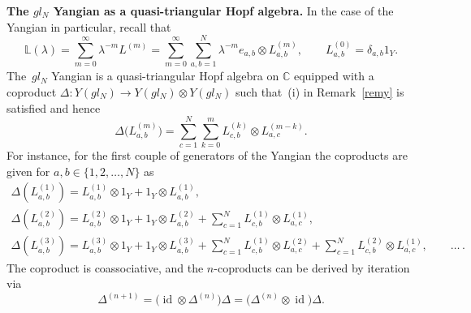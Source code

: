 \documentclass[10pt,a4paper]{amsart}
\numberwithin{equation}{section}
\theoremstyle{definition}
\newcommand{\id}{\operatorname{id}}
\def\boldsymbol#1{#1}%
\def\mathfrak#1{#1}%
\def\mathcal#1{#1}%
\begin{document}
{\bf The $\boldsymbol{\mathfrak{gl}_{\mathcal N}}$ Yangian as a quasi-triangular Hopf algebra.} In the case of the Yangian in particular, recall that
\[
{\mathbb L}(\lambda) = \sum_{m=0}^{\infty} \lambda^{-m } L^{(m)}= \sum_{m=0}^{\infty }\sum_{a,b =1}^{\mathcal N} \lambda^{-m}e_{a,b} \otimes L_{a,b}^{(m)}, \qquad L^{(0)}_{a,b} = \delta_{a,b}1_{\mathcal Y}.
\]
The~$\mathfrak{gl}_{\mathcal N}$ Yangian is a quasi-triangular Hopf algebra on ${\mathbb C}$ equipped with a coproduct $\Delta\colon\! {\mathcal Y}(\mathfrak{gl}_{\mathcal N})\! \to{\mathcal Y}(\mathfrak{gl}_{\mathcal N}) \otimes {\mathcal Y}(\mathfrak{gl}_{\mathcal N})$ such that~(i) in Remark~\ref{remy} is satisfied and hence
\begin{equation*}
\Delta\bigl(L^{(m)}_{a,b}\bigr) = \sum_{c=1}^{\mathcal N}\sum_{k=0}^{m} L^{(k)}_{c,b} \otimes L^{(m-k)}_{a,c}.
\end{equation*}
For instance, for the first couple of generators of the Yangian the coproducts are given for $a,b \in \{1,2, \dots, {\mathcal N}\}$ as
\begin{gather*}
\Delta(L_{a,b}^{(1)}) = L_{a,b}^{(1)} \otimes 1_{\mathcal Y} + 1_{\mathcal Y}\otimes
L_{a,b}^{(1)},\\
\Delta(L_{a,b}^{(2)}) = L_{a,b}^{(2)}
\otimes 1_{\mathcal Y}+ 1_{\mathcal Y}\otimes L_{a,b}^{(2)} +
\sum _{c=1}^{\mathcal N}
L_{c,b}^{(1)}\otimes L_{a,c}^{(1)}, \\
\Delta(L_{a,b}^{(3)}) = L_{a,b}^{(3)}
\otimes 1_{\mathcal Y}+ 1_{\mathcal Y}\otimes L_{a,b}^{(3)} +
\sum _{c=1}^{\mathcal N}
L_{c,b}^{(1)}\otimes L_{a,c}^{(2)} +
\sum _{c=1}^{\mathcal N}
L_{c,b}^{(2)}\otimes L_{a,c}^{(1)}, \qquad \dots \,.%
\end{gather*}
The coproduct is {coassociative}, and the $n$-coproducts can be derived by iteration via
\[\Delta^{(n+1)} = \bigl(\id \otimes \Delta^{(n)}\bigr)\Delta = \bigl(\Delta^{(n)} \otimes \id\bigr)\Delta.\]
\end{document}
